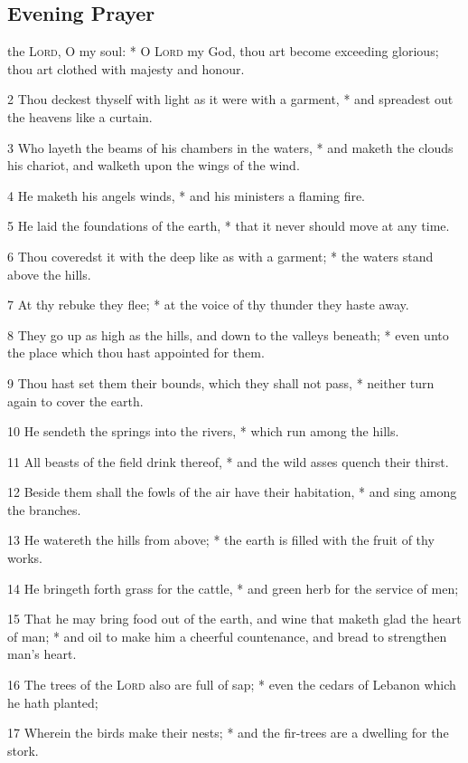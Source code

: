 \subsection{Evening Prayer}
 the {\textsc{Lord}}, O my soul: * O {\textsc{Lord}} my God, thou art become exceeding glorious; thou art clothed with majesty and honour.\par
2 Thou deckest thyself with light as it were with a garment, * and spreadest out the heavens like a curtain.\par
3 Who layeth the beams of his chambers in the waters, * and maketh the clouds his chariot, and walketh upon the wings of the wind.\par
4 He maketh his angels winds, * and his ministers a flaming fire.\par
5 He laid the foundations of the earth, * that it never should move at any time.\par
6 Thou coveredst it with the deep like as with a garment; * the waters stand above the hills.\par
7 At thy rebuke they flee; * at the voice of thy thunder they haste away.\par
8 They go up as high as the hills, and down to the valleys beneath; * even unto the place which thou hast appointed for them.\par
9 Thou hast set them their bounds, which they shall not pass, * neither turn again to cover the earth.\par
10 He sendeth the springs into the rivers, * which run among the hills.\par
11 All beasts of the field drink thereof, * and the wild asses quench their thirst.\par
12 Beside them shall the fowls of the air have their habitation, * and sing among the branches.\par
13 He watereth the hills from above; * the earth is filled with the fruit of thy works.\par
14 He bringeth forth grass for the cattle, * and green herb for the service of men;\par
15 That he may bring food out of the earth, and wine that maketh glad the heart of man; * and oil to make him a cheerful countenance, and bread to strengthen man's heart.\par
16 The trees of the {\textsc{Lord}} also are full of sap; * even the cedars of Lebanon which he hath planted;\par
17 Wherein the birds make their nests; * and the fir-trees are a dwelling for the stork.\par
